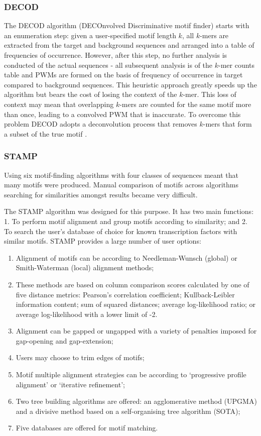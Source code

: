 \documentclass[12pt, onecolumn, oneside]{gsajnl}
\begin{document}
\subsubsection{DECOD\;\;}

The DECOD algorithm (DECOnvolved Discriminative motif finder) \citep{huggins2011decod} starts with an enumeration step: given a user-specified motif length $k$, all $k$-mers are extracted from the target and background sequences and arranged into a table of frequencies of occurrence. However, after this step, no further analysis is conducted of the actual sequences - all subsequent analysis is of the $k$-mer counts table and PWMs are formed on the basis of frequency of occurrence in target compared to background sequences. This heuristic approach greatly speeds up the algorithm but bears the cost of losing the context of the $k$-mer. This loss of context may mean that overlapping $k$-mers are counted for the same motif more than once, leading to a convolved PWM that is inaccurate. To overcome this problem DECOD adopts a deconvolution process that removes $k$-mers that form a subset of the true motif  \citep{huggins2011decod}.

\subsubsection{STAMP\;\;}


Using six motif-finding algorithms with four classes of sequences meant that many motifs were produced. Manual comparison of motifs across algorithms searching for similarities amongst results became very difficult. 

The STAMP algorithm \citep{mahony2007stamp} was designed for this purpose. It has two main functions:
1. To perform motif alignment and group motifs according to similarity; and
2. To search the user's database of choice for known transcription factors with similar motifs.  STAMP provides a large number of user options:

\begin{enumerate}
\item Alignment of motifs can be according to Needleman-Wunsch (global) or Smith-Waterman (local) alignment methods;
\item These methods are based on column comparison scores calculated by one of five distance metrics: Pearson's correlation coefficient; Kullback-Leibler information content; sum of squared distances; average log-likelihood ratio; or average log-likelihood with a lower limit of -2.
\item Alignment can be gapped or ungapped with a variety of penalties imposed for gap-opening and gap-extension;
\item Users may choose to trim edges of motifs;
\item Motif multiple alignment strategies can be according to `progressive profile alignment' or `iterative refinement';
\item  Two tree building algorithms are offered: an agglomerative method (UPGMA) and a divisive method based on a self-organising tree algorithm (SOTA);
\item Five databases are offered for motif matching.
\end{enumerate}
\end{document}
